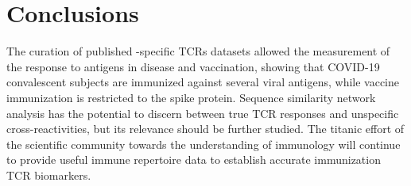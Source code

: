 \chapter*{Conclusions}
\label{cap:con}


The curation of published \covid-specific TCRs datasets allowed the measurement of the response to \covid{} antigens in disease and vaccination, showing that COVID-19 convalescent subjects are immunized against several viral antigens, while vaccine immunization is restricted to the spike protein. Sequence similarity network analysis has the potential to discern between true TCR responses and unspecific cross-reactivities, but its relevance should be further studied. The titanic effort of the scientific community towards the understanding of \covid{} immunology will continue to provide useful immune repertoire data to establish accurate \covid{} immunization TCR biomarkers.
